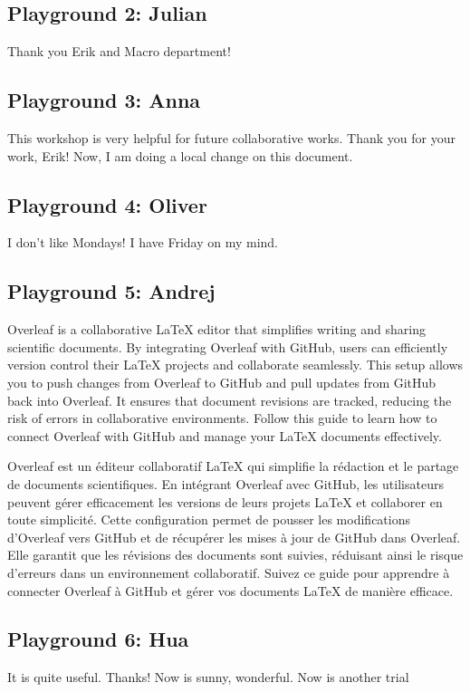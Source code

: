 \documentclass{article}
\begin{document}
\subsection{Playground 2: Julian}
Thank you Erik and Macro department! 

\subsection{Playground 3: Anna}
This workshop is very helpful for future collaborative works. Thank you for your work, Erik!
Now, I am doing a local change on this document.

\subsection{Playground 4: Oliver}
I don't like Mondays!
I have Friday on my mind.

\subsection{Playground 5: Andrej}
Overleaf is a collaborative LaTeX editor that simplifies writing and sharing scientific documents. By integrating Overleaf with GitHub, users can efficiently version control their LaTeX projects and collaborate seamlessly. This setup allows you to push changes from Overleaf to GitHub and pull updates from GitHub back into Overleaf. It ensures that document revisions are tracked, reducing the risk of errors in collaborative environments. Follow this guide to learn how to connect Overleaf with GitHub and manage your LaTeX documents effectively.

Overleaf est un éditeur collaboratif LaTeX qui simplifie la rédaction et le partage de documents scientifiques. En intégrant Overleaf avec GitHub, les utilisateurs peuvent gérer efficacement les versions de leurs projets LaTeX et collaborer en toute simplicité. Cette configuration permet de pousser les modifications d’Overleaf vers GitHub et de récupérer les mises à jour de GitHub dans Overleaf. Elle garantit que les révisions des documents sont suivies, réduisant ainsi le risque d’erreurs dans un environnement collaboratif. Suivez ce guide pour apprendre à connecter Overleaf à GitHub et gérer vos documents LaTeX de manière efficace.

\subsection{Playground 6: Hua}
It is quite useful. Thanks!
Now is sunny, wonderful.
Now is another trial
\end{document}
